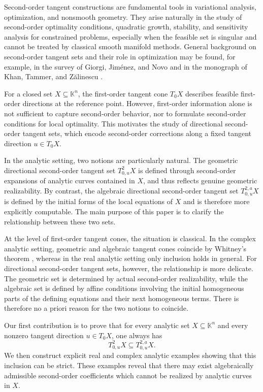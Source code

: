 \documentclass[10pt,reqno]{amsart}
\theoremstyle{break-italic}
\theoremstyle{break-italic}
\theoremstyle{break-italic}
\theoremstyle{break-italic}
\theoremstyle{break-italic}
\theoremstyle{break-italic}
\theoremstyle{break-italic}
\theoremstyle{break-italic}
\theoremstyle{break-roman}
\theoremstyle{standard}
\theoremstyle{varthm-roman}
\theoremstyle{varthm-italic}
\theoremstyle{varthm-roman-break}
\theoremstyle{varthm-italic-break}
\theoremstyle{varthm-roman-no-punctuation}
\theoremstyle{varthm-italic-no-punctuation}
\numberwithin{equation}{section}
\begin{document}
Second-order tangent constructions are fundamental tools in variational analysis, optimization, and nonsmooth geometry. They arise naturally in the study of second-order optimality conditions, quadratic growth, stability, and sensitivity analysis for constrained problems, especially when the feasible set is singular and cannot be treated by classical smooth manifold methods. General background on second-order tangent sets and their role in optimization may be found, for example, in the survey of Giorgi, Jiménez, and Novo \cite{GiJiNo10} and in the monograph of Khan, Tammer, and Z\u{a}linescu \cite{KTZ15}.

For a closed set $X\subseteq \mathbb K^n$, the first-order tangent cone $T_0X$ describes feasible first-order directions at the reference point. However, first-order information alone is not sufficient to capture second-order behavior, nor to formulate second-order conditions for local optimality. This motivates the study of directional second-order tangent sets, which encode second-order corrections along a fixed tangent direction $u\in T_0X$.

In the analytic setting, two notions are particularly natural. The geometric directional second-order tangent set $T^2_{0,u}X$ is defined through second-order expansions of analytic curves contained in $X$, and thus reflects
genuine geometric realizability. By contrast, the algebraic directional second-order tangent set $T^{2,a}_{0,u}X$ is defined by the initial forms of the local equations of $X$ and is therefore more explicitly computable. The main purpose of this paper is to clarify the relationship between these two sets.

At the level of first-order tangent cones, the situation is classical. In the complex analytic setting, geometric and algebraic tangent cones coincide by Whitney's theorem \cite{Wh65a, Wh65b}, whereas in the real analytic setting only inclusion holds in general. For directional second-order tangent sets, however, the relationship is more delicate. The geometric set is determined by actual second-order realizability, while the algebraic set is defined by affine conditions
involving the initial homogeneous parts of the defining equations and their next homogeneous terms. There is therefore no a priori reason for the two notions to coincide.

Our first contribution is to prove that for every analytic set $X\subseteq \mathbb K^n$ and every nonzero tangent direction $u\in T_0X$, one always has
\[
T^2_{0,u}X\subseteq T^{2,a}_{0,u}X.
\]
We then construct explicit real and complex analytic examples showing that this inclusion can be strict. These examples reveal that there may exist algebraically admissible second-order coefficients which cannot be realized by
analytic curves in $X$.
\end{document}
